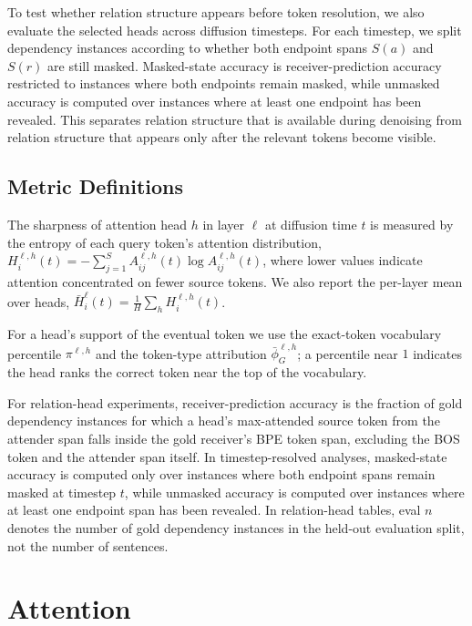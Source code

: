 \documentclass{article} %
\begin{document}
To test whether relation structure appears before token resolution, we also evaluate the selected heads across diffusion timesteps. For each timestep, we split dependency instances according to whether both endpoint spans $S(a)$ and $S(r)$ are still masked. Masked-state accuracy is receiver-prediction accuracy restricted to instances where both endpoints remain masked, while unmasked accuracy is computed over instances where at least one endpoint has been revealed. This separates relation structure that is available during denoising from relation structure that appears only after the relevant tokens become visible.



\subsection{Metric Definitions}\label{subsec:metrics}

The sharpness of attention head $h$ in layer $\ell$ at diffusion time $t$ is
measured by the entropy of each query token's attention distribution,
$H^{\ell,h}_i(t) = -\sum_{j=1}^{S} A^{\ell,h}_{ij}(t)\log A^{\ell,h}_{ij}(t)$,
where lower values indicate attention concentrated on fewer source tokens. We also report the per-layer mean over heads,
$\bar{H}^{\ell}_i(t)=\tfrac{1}{H}\sum_h H^{\ell,h}_i(t)$.

For a head's support of the eventual token we use the exact-token vocabulary
percentile $\pi^{\ell,h}$ and the token-type attribution $\bar{\phi}^{\ell,h}_G$; a percentile near $1$ indicates the head
ranks the correct token near the top of the vocabulary.

For relation-head experiments, receiver-prediction accuracy is the fraction of gold dependency instances for which a head's max-attended source token from the attender span falls inside the gold receiver's BPE token span, excluding the BOS token and the attender span itself. In timestep-resolved analyses, masked-state accuracy is computed only over instances where both endpoint spans remain masked at timestep $t$, while unmasked accuracy is computed over instances where at least one endpoint span has been revealed. In relation-head tables, eval $n$ denotes the number of gold dependency instances in the held-out evaluation split, not the number of sentences.




\section{Attention}
\end{document}
